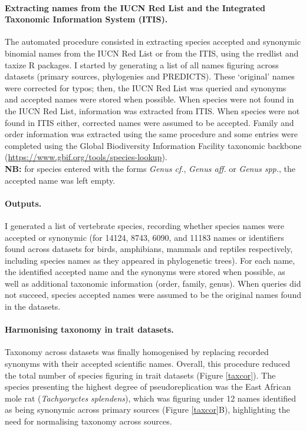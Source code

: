 \paragraph{Extracting names from the IUCN Red List and the Integrated Taxonomic Information System (ITIS).}
The automated procedure consisted in extracting species accepted and synonymic binomial names from the IUCN Red List or from the ITIS, using the rredlist and taxize R packages. I started by generating a list of all names figuring across datasets (primary sources, phylogenies and PREDICTS). These `original' names were corrected for typos; then, the IUCN Red List was queried and synonyms and accepted names were stored when possible. When species were not found in the IUCN Red List, information was extracted from ITIS. When species were not found in ITIS either, corrected names were assumed to be accepted. Family and order information was extracted using the same procedure and some entries were completed using the Global Biodiversity Information Facility taxonomic backbone (\url{https://www.gbif.org/tools/species-lookup}).\\
\textbf{NB:} for species entered with the forms \textit{Genus cf.}, \textit{Genus aff.} or \textit{Genus spp.}, the accepted name was left empty.

\paragraph{Outputs.} I generated a list of vertebrate species, recording whether species names were accepted or synonymic (for 14124, 8743, 6090, and 11183 names or identifiers found across datasets for birds, amphibians, mammals and reptiles respectively, including species names as they appeared in phylogenetic trees). For each name, the identified accepted name and the synonyms were stored when possible, as well as additional taxonomic information (order, family, genus). When queries did not succeed, species accepted names were assumed to be the original names found in the datasets.

\paragraph{Harmonising taxonomy in trait datasets.}
Taxonomy across datasets was finally homogenised by replacing recorded synonyms with their accepted scientific names. Overall, this procedure  reduced the total number of species figuring in trait datasets (Figure \ref{taxcor}). The species presenting the highest degree of pseudoreplication was the East African mole rat (\textit{Tachyoryctes splendens}), which was figuring under 12 names identified as being synonymic across primary sources (Figure \ref{taxcor}B), highlighting the need for normalising taxonomy across sources.

